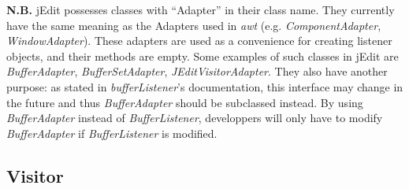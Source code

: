 \begin{framehint2}
    \textbf{N.B.} jEdit possesses classes with ``Adapter'' in their class name.
    They currently have the same meaning as the Adapters used in \emph{awt}
    (e.g. \emph{ComponentAdapter}, \emph{WindowAdapter}).
    These adapters are used as a convenience for creating listener objects, and
    their methods are empty.
    Some examples of such classes in jEdit are \emph{BufferAdapter},
    \emph{BufferSetAdapter}, \emph{JEditVisitorAdapter}.
    They also have another purpose: as stated in \emph{bufferListener}'s
    documentation, this interface may change in the future and thus
    \emph{BufferAdapter} should be subclassed instead.
    By using \emph{BufferAdapter} instead of \emph{BufferListener}, developpers
    will only have to modify \emph{BufferAdapter} if \emph{BufferListener} is
    modified.
\end{framehint2}
\newpage

\subsection{Visitor}

\newpage
